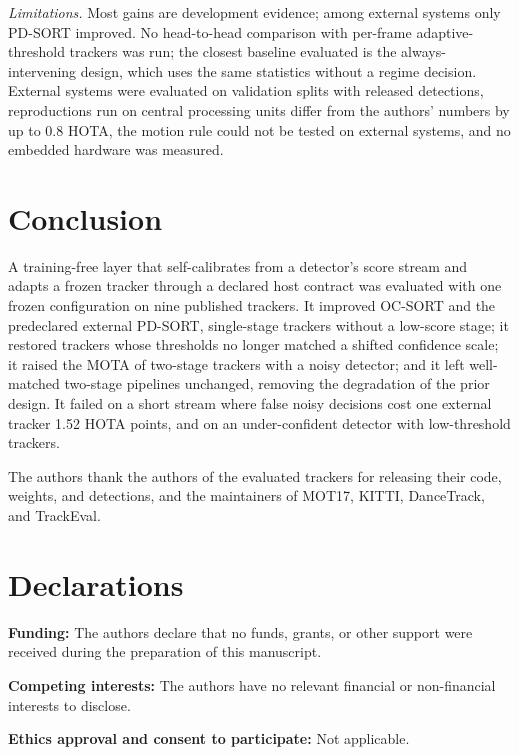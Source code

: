 \documentclass[pdflatex,sn-mathphys-num,iicol]{sn-jnl}
\begin{document}
\textit{Limitations.} Most gains are development evidence; among external systems only PD-SORT improved. No head-to-head comparison with per-frame adaptive-threshold trackers \cite{ma2023adaptivebytetrack,act2026adaptive} was run; the closest baseline evaluated is the always-intervening design, which uses the same statistics without a regime decision. External systems were evaluated on validation splits with released detections, reproductions run on central processing units differ from the authors' numbers by up to 0.8 HOTA, the motion rule could not be tested on external systems, and no embedded hardware was measured.

\section{Conclusion}\label{sec:conclusion}
A training-free layer that self-calibrates from a detector's score stream and adapts a frozen tracker through a declared host contract was evaluated with one frozen configuration on nine published trackers. It improved OC-SORT and the predeclared external PD-SORT, single-stage trackers without a low-score stage; it restored trackers whose thresholds no longer matched a shifted confidence scale; it raised the MOTA of two-stage trackers with a noisy detector; and it left well-matched two-stage pipelines unchanged, removing the degradation of the prior design. It failed on a short stream where false noisy decisions cost one external tracker 1.52 HOTA points, and on an under-confident detector with low-threshold trackers.

\backmatter

The authors thank the authors of the evaluated trackers for releasing their code, weights, and detections, and the maintainers of MOT17, KITTI, DanceTrack, and TrackEval.

\section*{Declarations}

\noindent\textbf{Funding:} The authors declare that no funds, grants, or other support were received during the preparation of this manuscript.

\noindent\textbf{Competing interests:} The authors have no relevant financial or non-financial interests to disclose.

\noindent\textbf{Ethics approval and consent to participate:} Not applicable.
\end{document}
